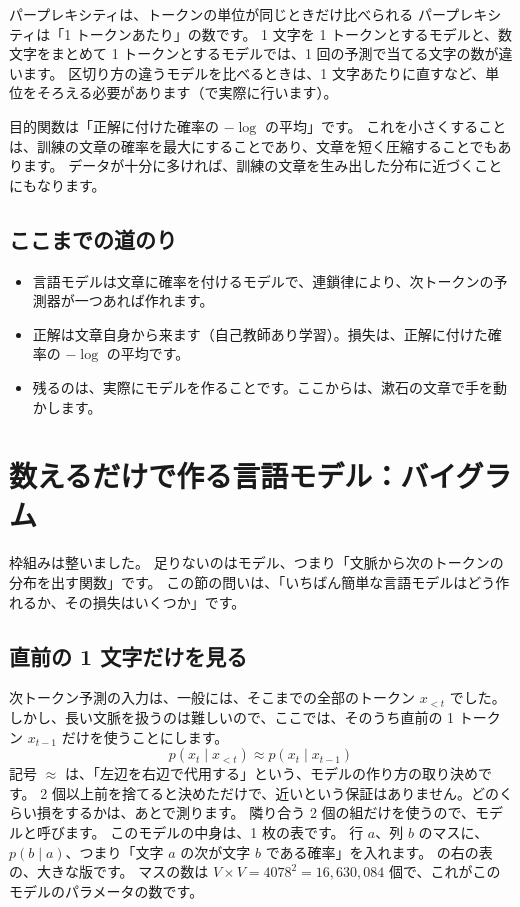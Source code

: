 \begin{caution}{パープレキシティは、トークンの単位が同じときだけ比べられる}
パープレキシティは「1 トークンあたり」の数です。
1 文字を 1 トークンとするモデルと、数文字をまとめて 1 トークンとするモデルでは、1 回の予測で当てる文字の数が違います。
区切り方の違うモデルを比べるときは、1 文字あたりに直すなど、単位をそろえる必要があります（で実際に行います）。
\end{caution}

目的関数は「正解に付けた確率の $-\log$ の平均」です。
これを小さくすることは、訓練の文章の確率を最大にすることであり、文章を短く圧縮することでもあります。
データが十分に多ければ、訓練の文章を生み出した分布に近づくことにもなります。

\subsection*{ここまでの道のり}

\begin{itemize}
\item 言語モデルは文章に確率を付けるモデルで、連鎖律により、次トークンの予測器が一つあれば作れます。
\item 正解は文章自身から来ます（自己教師あり学習）。損失は、正解に付けた確率の $-\log$ の平均です。
\item 残るのは、実際にモデルを作ることです。ここからは、漱石の文章で手を動かします。
\end{itemize}

\section{数えるだけで作る言語モデル：バイグラム}\label{sec:lm-bigram-count}

枠組みは整いました。
足りないのはモデル、つまり「文脈から次のトークンの分布を出す関数」です。
この節の問いは、「いちばん簡単な言語モデルはどう作れるか、その損失はいくつか」です。

\subsection*{直前の 1 文字だけを見る}

次トークン予測の入力は、一般には、そこまでの全部のトークン $x_{<t}$ でした。
しかし、長い文脈を扱うのは難しいので、ここでは、そのうち直前の 1 トークン $x_{t-1}$ だけを使うことにします。
\begin{equation}
p(x_t\mid x_{<t})\approx p(x_t\mid x_{t-1})
\label{eq:lm-bigram}
\end{equation}
記号 $\approx$ は、「左辺を右辺で代用する」という、モデルの作り方の取り決めです。
2 個以上前を捨てると決めただけで、近いという保証はありません。どのくらい損をするかは、あとで測ります。
隣り合う 2 個の組だけを使うので、モデルと呼びます。
このモデルの中身は、1 枚の表です。
行 $a$、列 $b$ のマスに、$p(b\mid a)$、つまり「文字 $a$ の次が文字 $b$ である確率」を入れます。
の右の表の、大きな版です。
マスの数は $V\times V=4078^{2}=16{,}630{,}084$ 個で、これがこのモデルのパラメータの数です。


